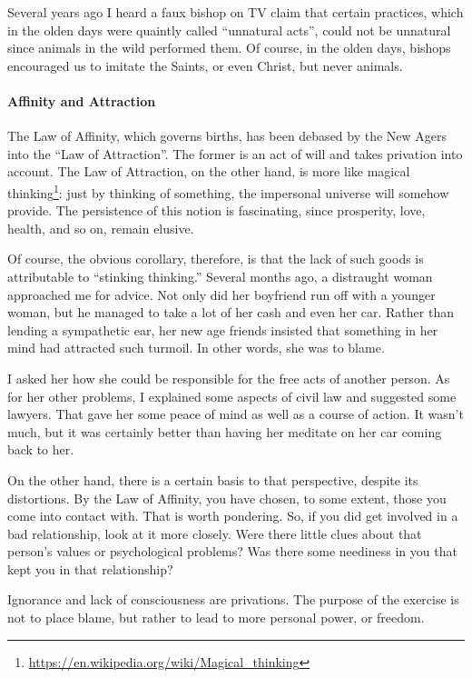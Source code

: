 Several years ago I heard a faux bishop on TV claim that certain practices, which in the olden days were quaintly called ``unnatural acts'', could not be unnatural since animals in the wild performed them. Of course, in the olden days, bishops encouraged us to imitate the Saints, or even Christ, but never animals.

\paragraph{Affinity and Attraction}


The Law of Affinity, which governs births, has been debased by the New Agers into the ``Law of Attraction''. The former is an act of will and takes privation into account. The Law of Attraction, on the other hand, is more like magical thinking\footnote{\url{https://en.wikipedia.org/wiki/Magical_thinking}}: just by thinking of something, the impersonal universe will somehow provide. The persistence of this notion is fascinating, since prosperity, love, health, and so on, remain elusive.

Of course, the obvious corollary, therefore, is that the lack of such goods is attributable to ``stinking thinking.'' Several months ago, a distraught woman approached me for advice. Not only did her boyfriend run off with a younger woman, but he managed to take a lot of her cash and even her car. Rather than lending a sympathetic ear, her new age friends insisted that something in her mind had attracted such turmoil. In other words, she was to blame.

I asked her how she could be responsible for the free acts of another person. As for her other problems, I explained some aspects of civil law and suggested some lawyers. That gave her some peace of mind as well as a course of action. It wasn't much, but it was certainly better than having her meditate on her car coming back to her.

On the other hand, there is a certain basis to that perspective, despite its distortions. By the Law of Affinity, you have chosen, to some extent, those you come into contact with. That is worth pondering. So, if you did get involved in a bad relationship, look at it more closely. Were there little clues about that person's values or psychological problems? Was there some neediness in you that kept you in that relationship?

Ignorance and lack of consciousness are privations. The purpose of the exercise is not to place blame, but rather to lead to more personal power, or freedom.

